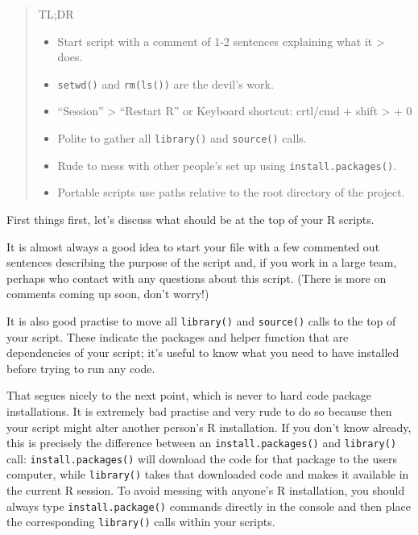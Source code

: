 \documentclass[
  letterpaper,
  DIV=11,
  numbers=noendperiod]{scrreprt}
\providecommand{\tightlist}{%
  \setlength{\itemsep}{0pt}\setlength{\parskip}{0pt}}\usepackage{longtable,booktabs,array}
\begin{document}
\begin{quote}
TL;DR

\begin{itemize}
\tightlist
\item
  Start script with a comment of 1-2 sentences explaining what it
  \textgreater{} does.
\item
  \texttt{setwd()} and \texttt{rm(ls())} are the devil's work.
\item
  ``Session'' \textgreater{} ``Restart R'' or Keyboard shortcut:
  crtl/cmd + shift \textgreater{} + 0
\item
  Polite to gather all \texttt{library()} and \texttt{source()} calls.
\item
  Rude to mess with other people's set up using
  \texttt{install.packages()}.
\item
  Portable scripts use paths relative to the root directory of the
  project.
\end{itemize}
\end{quote}

First things first, let's discuss what should be at the top of your R
scripts.

It is almost always a good idea to start your file with a few commented
out sentences describing the purpose of the script and, if you work in a
large team, perhaps who contact with any questions about this script.
(There is more on comments coming up soon, don't worry!)

It is also good practise to move all \texttt{library()} and
\texttt{source()} calls to the top of your script. These indicate the
packages and helper function that are dependencies of your script; it's
useful to know what you need to have installed before trying to run any
code.

That segues nicely to the next point, which is never to hard code
package installations. It is extremely bad practise and very rude to do
so because then your script might alter another person's R installation.
If you don't know already, this is precisely the difference between an
\texttt{install.packages()} and \texttt{library()} call:
\texttt{install.packages()} will download the code for that package to
the users computer, while \texttt{library()} takes that downloaded code
and makes it available in the current R session. To avoid messing with
anyone's R installation, you should always type
\texttt{install.package()} commands directly in the console and then
place the corresponding \texttt{library()} calls within your scripts.
\end{document}
